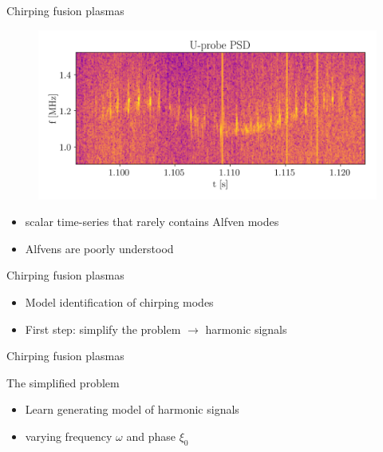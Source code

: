 \documentclass{beamer}
\begin{document}
\begin{frame}{Chirping fusion plasmas}
  \begin{figure}
    \centering
    \includegraphics[width=.8\linewidth]{figs/alfven_patch_psd.png}
  \end{figure}
  \begin{itemize}
    \item scalar time-series that rarely contains \alert{Alfven modes}
    \item Alfvens are poorly understood
  \end{itemize}
\end{frame} 

\begin{frame}{Chirping fusion plasmas}
  \centering
  \resizebox{!}{.4\textwidth}{}
  \begin{itemize}
    \item \alert{Model identification} of chirping modes
    \item First step: simplify the problem $\rightarrow$ harmonic signals
  \end{itemize}
\end{frame} 

\begin{frame}{Chirping fusion plasmas}
  \centering
  \resizebox{.6\textwidth}{!}{}
  \begin{block}{The simplified problem}
    \begin{itemize}
      \item Learn generating model of harmonic signals
      \item varying frequency $\omega$ and phase $\xi_0$
    \end{itemize}
  \end{block}
\end{frame}
\end{document}
